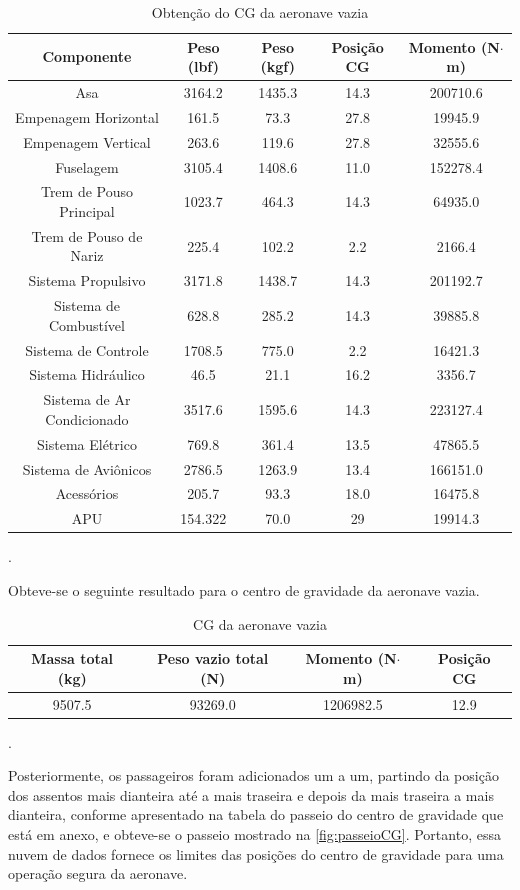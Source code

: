 \begin{table}[H]
\centering
\begin{tabular}{ccccc}
\toprule
 Componente & Peso (lbf) & Peso (kgf) & Posição CG & Momento (N$\cdot$m) \\ \midrule
Asa & 3164.2 & 1435.3 & 14.3 & 200710.6 \\
Empenagem Horizontal & 161.5 & 73.3 & 27.8 & 19945.9 \\
Empenagem Vertical & 263.6 & 119.6 & 27.8 & 32555.6 \\
Fuselagem & 3105.4 & 1408.6 & 11.0 & 152278.4 \\
Trem de Pouso Principal & 1023.7 & 464.3 & 14.3 & 64935.0 \\
Trem de Pouso de Nariz & 225.4 & 102.2 & 2.2 & 2166.4 \\
Sistema Propulsivo & 3171.8 & 1438.7 & 14.3 & 201192.7 \\
Sistema de Combustível & 628.8 & 285.2 & 14.3 & 39885.8 \\
Sistema de Controle & 1708.5 & 775.0 & 2.2 & 16421.3 \\
Sistema Hidráulico & 46.5 & 21.1 & 16.2 & 3356.7 \\
Sistema de Ar Condicionado & 3517.6 & 1595.6 & 14.3 & 223127.4 \\
Sistema Elétrico & 769.8 & 361.4 & 13.5 & 47865.5 \\
Sistema de Aviônicos & 2786.5 & 1263.9 & 13.4 & 166151.0 \\
Acessórios & 205.7 & 93.3 & 18.0 & 16475.8 \\
APU & 154.322 & 70.0 & 29 & 19914.3 \\
\bottomrule
\end{tabular}
\caption{Obtenção do CG da aeronave vazia}
\label{tbl:cg_vazio}
\end{table}.

Obteve-se o seguinte resultado para o centro de gravidade da aeronave vazia.

\begin{table}[H]
\centering
\begin{tabular}{cccc}
\toprule
 Massa total (kg) & Peso vazio total (N) & Momento (N$\cdot$m) & Posição CG  \\ \midrule
9507.5 & 93269.0 & 1206982.5 & 12.9 \\
\bottomrule
\end{tabular}
\caption{CG da aeronave vazia}
\label{tbl:cg_vazio_res}
\end{table}.

Posteriormente, os passageiros foram adicionados um a um, partindo da posição dos assentos mais dianteira até a mais traseira e depois da mais traseira a mais dianteira, conforme apresentado na tabela do passeio do centro de gravidade que está em anexo, e obteve-se o passeio mostrado na \autoref{fig:passeioCG}. Portanto, essa nuvem de dados fornece os limites das posições do centro de gravidade para uma operação segura da aeronave.

